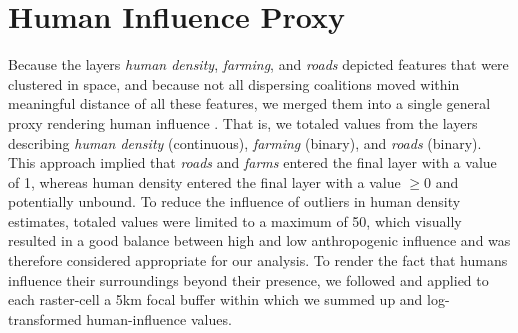 \documentclass[abstract=off,10pt,a4paper,bibliography=totocnumbered]{article}
\begin{document}
\newpage
\section{Human Influence Proxy}
Because the layers \textit{human density}, \textit{farming}, and \textit{roads}
depicted features that were clustered in space, and because not all dispersing
coalitions moved within meaningful distance of all these features, we merged
them into a single general proxy rendering human influence
. That is, we totaled values from the layers describing
\textit{human density} (continuous), \textit{farming} (binary), and
\textit{roads} (binary). This approach implied that \textit{roads} and
\textit{farms} entered the final layer with a value of 1, whereas human density
entered the final layer with a value \(\geq 0\) and potentially unbound. To
reduce the influence of outliers in human density estimates, totaled values were
limited to a maximum of 50, which visually resulted in a good balance between
high and low anthropogenic influence and was therefore considered appropriate
for our analysis. To render the fact that humans influence their surroundings
beyond their presence, we followed \cite{Elliot.2014} and applied to each
raster-cell a 5km focal buffer within which we summed up and log-transformed
human-influence values.
\end{document}
